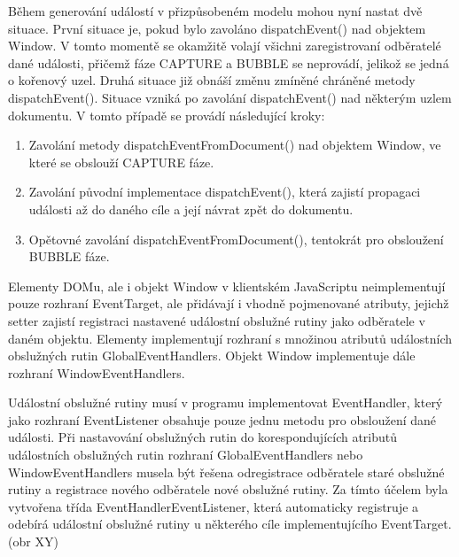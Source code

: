 Během generování událostí v přizpůsobeném modelu mohou nyní nastat dvě situace. První situace je, pokud bylo zavoláno dispatchEvent() nad objektem Window. V tomto momentě se okamžitě volají všichni zaregistrovaní odběratelé dané události, přičemž fáze CAPTURE a BUBBLE se neprovádí, jelikož se jedná o kořenový uzel. Druhá situace již obnáší změnu zmíněné chráněné metody dispatchEvent(). Situace vzniká po zavolání dispatchEvent() nad některým uzlem dokumentu. V tomto případě se provádí následující kroky:

\begin{enumerate}
  \item Zavolání metody dispatchEventFromDocument() nad objektem Window, ve které se obslouží CAPTURE fáze. 
  \item Zavolání původní implementace dispatchEvent(), která zajistí propagaci události až do daného cíle a její návrat zpět do dokumentu. 
  \item Opětovné zavolání dispatchEventFromDocument(), tentokrát pro obsloužení BUBBLE fáze.
\end{enumerate}

Elementy DOMu, ale i objekt Window v klientském JavaScriptu neimplementují pouze rozhraní EventTarget, ale přidávají i vhodně pojmenované atributy, jejichž setter zajistí registraci nastavené událostní obslužné rutiny jako odběratele v daném objektu. Elementy implementují rozhraní s množinou atributů událostních obslužných rutin GlobalEventHandlers. Objekt Window implementuje dále rozhraní WindowEventHandlers.

Událostní obslužné rutiny musí v programu implementovat EventHandler, který jako rozhraní EventListener obsahuje pouze jednu metodu pro obsloužení dané události. Při nastavování obslužných rutin do korespondujících atributů událostních obslužných rutin rozhraní GlobalEventHandlers nebo WindowEventHandlers musela být řešena odregistrace odběratele staré obslužné rutiny a registrace nového odběratele nové obslužné rutiny. Za tímto účelem byla vytvořena třída EventHandlerEventListener, která automaticky registruje a odebírá událostní obslužné rutiny u některého cíle implementujícího EventTarget. (obr XY)

